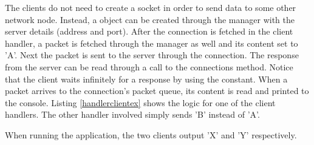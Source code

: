 The clients do not need to create a socket in order to send data to some other network node. Instead, a  object can be created through the manager with the server details (address and port). After the connection is fetched in the client handler, a packet is fetched through the manager as well and its content set to 'A'. Next the packet is sent to the server through the connection. The response from the server can be read through a call to the connections  method. Notice that the client waits infinitely for a response by using the  constant. When a packet arrives to the connection's packet queue, its content is read and printed to the console. Listing \ref{handlerclientex} shows the logic for one of the client handlers. The other handler involved simply sends 'B' instead of 'A'.



When running the application, the two clients output 'X' and 'Y' respectively.